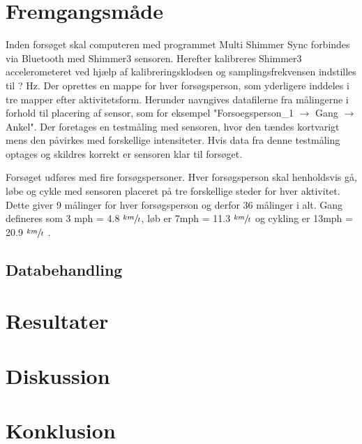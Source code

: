 \section{Fremgangsmåde}
Inden forsøget skal computeren med programmet Multi Shimmer Sync forbindes via Bluetooth med Shimmer3 sensoren. Herefter kalibreres Shimmer3 accelerometeret ved hjælp af kalibreringsklodsen og samplingsfrekvensen indstilles til ? Hz. %
Der oprettes en mappe for hver forsøgsperson, som yderligere inddeles i tre mapper efter aktivitetsform. Herunder navngives datafilerne fra målingerne i forhold til placering af sensor, som for eksempel "Forsoegsperson\_1 $\rightarrow$ Gang $\rightarrow$ Ankel".
Der foretages en testmåling med sensoren, hvor den tændes kortvarigt mens den påvirkes med forskellige intensiteter. Hvis data fra denne testmåling optages og skildres korrekt er sensoren klar til forsøget.

Forsøget udføres med fire forsøgspersoner. Hver forsøgsperson skal henholdsvis gå, løbe og cykle med sensoren placeret på tre forskellige steder for hver aktivitet. Dette giver 9 målinger for hver forsøgsperson og derfor 36 målinger i alt. Gang defineres som 3 mph = 4.8 $\sfrac{km}{t}$, løb er 7mph = 11.3 $\sfrac{km}{t}$ og cykling er 13mph = 20.9 $\sfrac{km}{t}$ \citep{Miles2007}.

\subsection{Databehandling}

\section{Resultater}

\section{Diskussion}

\section{Konklusion}

%
%
